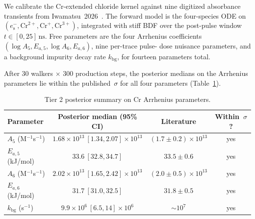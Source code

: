 \documentclass[12pt]{article}
\theoremstyle{plain}
\theoremstyle{definition}
\theoremstyle{remark}
\newcommand{\eS}{\ensuremath{e_{\mathrm{s}}^{-}}\xspace}
\begin{document}
We calibrate the Cr-extended chloride kernel against nine digitized
absorbance transients from Iwamatsu~2026~\citep{Iwamatsu2026}.  The forward
model is the four-species ODE on $(\eS, \mathrm{Cr}^{2+}, \mathrm{Cr}^+,
\mathrm{Cr}^{3+})$, integrated with stiff BDF over the post-pulse window
$t\in[0, 25]\,\mathrm{ns}$.  Free parameters are the four Arrhenius
coefficients $(\log A_5, E_{a,5}, \log A_6, E_{a,6})$, nine per-trace pulse-
dose nuisance parameters, and a background impurity decay rate
$k_{\mathrm{bg}}$, for fourteen parameters total.

After $30$ walkers $\times$ $300$ production steps, the posterior medians
on the Arrhenius parameters lie within the published~$\sigma$ for all four
parameters (Table~\ref{tab:tier2_summary}).

\begin{table}[ht]\centering
\caption{Tier 2 posterior summary on Cr Arrhenius parameters.}
\label{tab:tier2_summary}
\small
\begin{tabular}{lccc}
\toprule
Parameter & Posterior median (95\% CI) & Literature & Within~$\sigma$? \\
\midrule
$A_5$ (M$^{-1}$s$^{-1}$) & $1.68\times 10^{13}\ [1.34, 2.07]\times 10^{13}$ & $(1.7\pm 0.2)\times 10^{13}$ & yes \\
$E_{a,5}$ (kJ/mol) & $33.6\ [32.8, 34.7]$ & $33.5\pm 0.6$ & yes \\
$A_6$ (M$^{-1}$s$^{-1}$) & $2.02\times 10^{13}\ [1.65, 2.42]\times 10^{13}$ & $(2.0\pm 0.5)\times 10^{13}$ & yes \\
$E_{a,6}$ (kJ/mol) & $31.7\ [31.0, 32.5]$ & $31.8\pm 0.5$ & yes \\
$k_{\mathrm{bg}}$ (s$^{-1}$) & $9.9\times 10^6\ [6.5, 14]\times 10^6$ & $\sim 10^7$ & yes \\
\bottomrule
\end{tabular}
\end{table}
\end{document}

